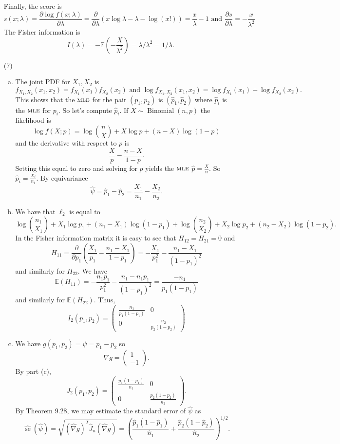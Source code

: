 \documentclass[10pt]{article}
\newcommand{\E}{\mathbb{E}}
\newcommand{\Binom}{\operatorname{Binomial}}
\newcommand{\se}{\operatorname{se}}
\newcommand{\MLE}{\textsc{mle}}
\begin{document}
\begin{enumerate}
Finally, the score is
\[
s(x;\lambda)=\frac{\partial \log f(x;\lambda)}{\partial \lambda}
= \frac{\partial}{\partial \lambda} (x\log \lambda - \lambda -\log(x!))
= \frac{x}{\lambda} - 1 \text{ and } \frac{\partial s}{\partial \lambda}
=-\frac{x}{\lambda^2}
\]
The Fisher information is
\[
I(\lambda) = -\E\left(-\frac{X}{\lambda^2}\right) = \lambda / \lambda^2 = 1/\lambda.
\]

\item[(7)]
\begin{enumerate}[(a)]
\item The joint PDF for $X_1,X_2$ is
\[
f_{X_1,X_2}(x_1,x_2)=f_{X_1}(x_1)f_{X_2}(x_2) \text{ and }
\log f_{X_1,X_2}(x_1,x_2) = \log f_{X_1}(x_1) + \log f_{X_2}(x_2).
\]
This shows that the $\MLE$ for the pair $(p_1,p_2)$ is $(\hat p_1,\hat p_2)$
where $\hat p_i$ is the $\MLE$ for $p_i$. So let's compute $\hat p_i$.
If $X\sim \Binom(n,p)$ the likelihood is
\[
\log f(X;p) = \log \binom{n}{X} + X\log p + (n-X)\log(1-p)
\]
and the derivative with respect to $p$ is
\[
\frac{X}{p} - \frac{n-X}{1-p}.
\]
Setting this equal to zero and solving for $p$ yields the $\MLE$
$\hat p = \frac{X}{n}$. So $\hat p_i = \frac{X_i}{n_i}$. By
equivariance
\[
\hat \psi = \hat p_1 - \hat p_2 = \frac{X_1}{n_1} - \frac{X_2}{n_2}.
\]

\item We have that $\ell_2$ is equal to
\[
\log \binom{n_1}{X_1} + X_1 \log p_1 + (n_1 - X_1)\log(1-p_1)
+ \log \binom{n_2}{X_2} + X_2 \log p_2 + (n_2 - X_2) \log(1-p_2).
\]
In the Fisher information matrix it is easy to see that $H_{12}=H_{21}=0$
and
\[
H_{11} =
\frac{\partial}{\partial p_1} \left(\frac{X_1}{p_1} - \frac{n_1-X_1}{1-p_1}\right)
= -\frac{X_1}{p_1^2} - \frac{n_1 - X_1}{(1-p_1)^2}
\]
and similarly for $H_{22}$. We have
\[
\E(H_{11}) = -\frac{n_1 p_1}{p_1^2} - \frac{n_1 - n_1 p_1}{(1-p_1)^2}
= \frac{-n_1}{p_1(1-p_1)}
\]
and similarly for $\E(H_{22})$. Thus,
\[
I_2(p_1,p_2) = \begin{pmatrix}
\frac{n_1}{p_1(1-p_1)} & 0 \\
0 & \frac{n_2}{p_2(1-p_2)}
\end{pmatrix}
\]

\item We have $g(p_1,p_2)=\psi = p_1 - p_2$ so
\[
\nabla g = \begin{pmatrix} 1 \\ -1 \end{pmatrix}.
\]
By part (c),
\[
J_2(p_1,p_2) = \begin{pmatrix}
\frac{p_1(1-p_1)}{n_1} & 0 \\
0 & \frac{p_2(1-p_2)}{n_2}
\end{pmatrix}.
\]
By Theorem 9.28, we may estimate the standard error of $\hat \psi$ as
\[
\hat{\se}(\hat \psi) = \sqrt{(\hat \nabla g)^T \hat J_n (\hat \nabla g)} =
\left(\frac{\hat p_1(1-\hat p_1)}{\hat n_1} + \frac{\hat p_2 (1-\hat p_2)}{\hat n_2}\right)^{1/2}.
\]


\end{enumerate}
\end{enumerate}
\end{document}
